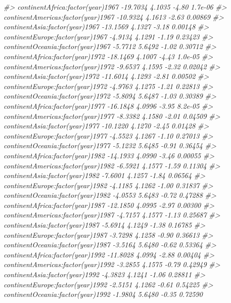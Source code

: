 \documentclass[]{book}
\newenvironment{Shaded}{\begin{snugshade}}{\end{snugshade}}
\newcommand{\CommentTok}[1]{\textcolor[rgb]{0.56,0.35,0.01}{\textit{#1}}}
\begin{document}
\begin{Shaded}
\begin{Highlighting}[]
\CommentTok{#> continentAfrica:factor(year)1967   -19.7034     4.1035   -4.80  1.7e-06}
\CommentTok{#> continentAmericas:factor(year)1967 -10.9324     4.1613   -2.63  0.00869}
\CommentTok{#> continentAsia:factor(year)1967     -13.1569     4.1327   -3.18  0.00148}
\CommentTok{#> continentEurope:factor(year)1967    -4.9134     4.1291   -1.19  0.23423}
\CommentTok{#> continentOceania:factor(year)1967   -5.7712     5.6492   -1.02  0.30712}
\CommentTok{#> continentAfrica:factor(year)1972   -18.1469     4.1007   -4.43  1.0e-05}
\CommentTok{#> continentAmericas:factor(year)1972  -9.6537     4.1595   -2.32  0.02042}
\CommentTok{#> continentAsia:factor(year)1972     -11.6014     4.1293   -2.81  0.00502}
\CommentTok{#> continentEurope:factor(year)1972    -4.9763     4.1275   -1.21  0.22813}
\CommentTok{#> continentOceania:factor(year)1972   -5.8094     5.6487   -1.03  0.30389}
\CommentTok{#> continentAfrica:factor(year)1977   -16.1848     4.0996   -3.95  8.2e-05}
\CommentTok{#> continentAmericas:factor(year)1977  -8.3382     4.1580   -2.01  0.04509}
\CommentTok{#> continentAsia:factor(year)1977     -10.1220     4.1270   -2.45  0.01428}
\CommentTok{#> continentEurope:factor(year)1977    -4.5523     4.1267   -1.10  0.27013}
\CommentTok{#> continentOceania:factor(year)1977   -5.1232     5.6485   -0.91  0.36454}
\CommentTok{#> continentAfrica:factor(year)1982   -14.1933     4.0990   -3.46  0.00055}
\CommentTok{#> continentAmericas:factor(year)1982  -6.5921     4.1577   -1.59  0.11304}
\CommentTok{#> continentAsia:factor(year)1982      -7.6001     4.1257   -1.84  0.06564}
\CommentTok{#> continentEurope:factor(year)1982    -4.1185     4.1262   -1.00  0.31837}
\CommentTok{#> continentOceania:factor(year)1982   -4.0553     5.6483   -0.72  0.47288}
\CommentTok{#> continentAfrica:factor(year)1987   -12.1850     4.0995   -2.97  0.00300}
\CommentTok{#> continentAmericas:factor(year)1987  -4.7157     4.1577   -1.13  0.25687}
\CommentTok{#> continentAsia:factor(year)1987      -5.6914     4.1249   -1.38  0.16785}
\CommentTok{#> continentEurope:factor(year)1987    -3.7298     4.1258   -0.90  0.36613}
\CommentTok{#> continentOceania:factor(year)1987   -3.5164     5.6480   -0.62  0.53364}
\CommentTok{#> continentAfrica:factor(year)1992   -11.8028     4.0994   -2.88  0.00404}
\CommentTok{#> continentAmericas:factor(year)1992  -3.2855     4.1575   -0.79  0.42949}
\CommentTok{#> continentAsia:factor(year)1992      -4.3823     4.1241   -1.06  0.28811}
\CommentTok{#> continentEurope:factor(year)1992    -2.5151     4.1262   -0.61  0.54225}
\CommentTok{#> continentOceania:factor(year)1992   -1.9804     5.6480   -0.35  0.72590}

\end{Highlighting}
\end{Shaded}
\end{document}
